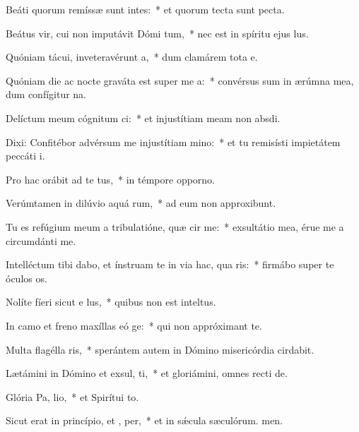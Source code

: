 \item Beáti quorum remíssæ sunt intes:~* et quorum tecta sunt pecta.
\item Beátus vir, cui non imputávit Dómi tum,~* nec est in spíritu ejus lus.
\item Quóniam tácui, inveteravérunt  a,~* dum clamárem tota e.
\item Quóniam die ac nocte graváta est super me  a:~* convérsus sum in ærúmna mea, dum confígitur na.
\item Delíctum meum cógnitum  ci:~* et injustítiam meam non absdi.
\item Dixi: Confitébor advérsum me injustítiam  mino:~* et tu remisísti impietátem peccáti i.
\item Pro hac orábit ad te  tus,~* in témpore opporno.
\item Verúmtamen in dilúvio aquá rum,~* ad eum non approxibunt.
\item Tu es refúgium meum a tribulatióne, quæ cir me:~* exsultátio mea, érue me a circumdánti me.
\item Intelléctum tibi dabo, et ínstruam te in via hac, qua ris:~* firmábo super te óculos os.
\item Nolíte fíeri sicut e  lus,~* quibus non est inteltus.
\item In camo et freno maxíllas eó ge:~* qui non appróximant  te.
\item Multa flagélla ris,~* sperántem autem in Dómino misericórdia cirdabit.
\item Lætámini in Dómino et exsul, ti,~* et gloriámini, omnes recti de.
\item Glória Pa,  lio,~* et Spirítui to.
\item Sicut erat in princípio, et ,  per,~* et in sǽcula sæculórum. men.
